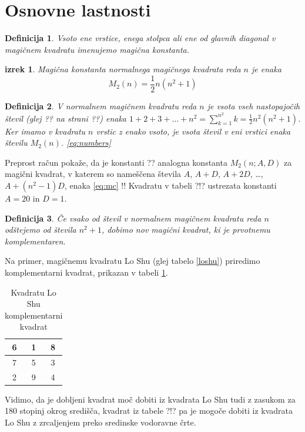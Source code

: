 \documentclass[a4paper,12pt]{article}
\newtheorem{definition}{Definicija}
\newtheorem{theorem}{izrek}
\begin{document}
\section{Osnovne lastnosti}

  \begin{definition}
      Vsoto ene vrstice, enega stolpca ali ene od glavnih diagonal
      v magičnem kvadratu imenujemo \emph{magična konstanta}.
  \end{definition}

  \begin{theorem}
    Magična konstanta normalnega magičnega kvadrata reda \( n \) je enaka
    \begin{equation}
       \label{eq:mc}
       M_2(n) = \frac{1}{2} n(n^2+1)
    \end{equation}
 \end{theorem}

\begin{definition}
   V normalnem magičnem kvadratu reda $n$ je vsota vseh nastopajočih
   števil (glej ?? na strani ??) enaka
   $1+2+3+\dots+n^2=\sum_{k=1}^{n^2}k=\frac{1}{2}n^2(n^2+1)$. Ker imamo
   v kvadratu $n$ vrstic z enako vsoto, je vsota števil v eni vrstici
   enaka številu $M_2(n)$. \ref{eq:numbers}
\end{definition}
   

Preprost račun pokaže, da je konstanti ?? analogna konstanta
$M_2(n;A,D)$ za magični kvadrat, v katerem so nameščena števila
$A$, $A+D$, $A+2D$, \dots, $A+(n^2-1)D$, enaka \ref{eq:mc}
!!
Kvadratu v tabeli ?!? ustrezata konstanti $A=20$ in $D=1$.

\begin{definition}
      Če vsako od števil v normalnem magičnem kvadratu reda $n$ odštejemo
      od števila $n^2+1$, dobimo nov magični kvadrat, ki je prvotnemu
      \emph{komplementaren}.
\end{definition}

Na primer, magičnemu kvadratu Lo Shu (glej tabelo \ref{loshu}) priredimo
komplementarni kvadrat, prikazan v tabeli \ref{closhu}.
%
\begin{table}[h!]
   \centering
   \caption{Kvadratu Lo Shu komplementarni kvadrat}
   \label{closhu}
   \begin{tabular}{|c|c|c|}
      \hline
      6 & 1 & 8 \\\hline
      7 & 5 & 3 \\\hline
      2 & 9 & 4 \\\hline
   \end{tabular}
\end{table}
Vidimo, da je dobljeni kvadrat moč dobiti iz kvadrata Lo Shu tudi z zasukom za
180 stopinj okrog središča, kvadrat iz tabele ?!? pa je mogoče dobiti
iz kvadrata Lo Shu z zrcaljenjem preko sredinske vodoravne črte.
\end{document}

